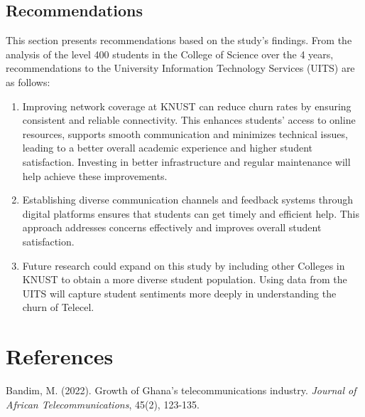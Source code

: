 \documentclass[doublespacing,12pt]{report}
\begin{document}
{ 



\section{Recommendations}
\normalsize{This section presents recommendations based on the study’s findings. From the analysis of the level 400 students in the College of Science over the 4 years, recommendations to the University Information Technology Services (UITS)  are as follows:}
\begin{enumerate}
        \item \normalsize{Improving network coverage at KNUST can reduce churn rates by ensuring consistent and reliable connectivity. This enhances students' access to online resources, supports smooth communication and minimizes technical issues, leading to a better overall academic experience and higher student satisfaction. Investing in better infrastructure and regular maintenance will help achieve these improvements}.

    \item  \normalsize{Establishing diverse communication channels and feedback systems through digital platforms ensures that students can get timely and efficient help. This 	approach addresses concerns effectively and improves overall student satisfaction.}
 
	\item \normalsize{Future research could expand on this study by including other Colleges in KNUST to obtain a more diverse student population. Using data from the UITS will capture student sentiments more deeply in understanding the churn of Telecel.}

\end{enumerate}









\chapter*{References}


\begin{enumerate}[label=\textbf{[\arabic*]}]


\item Bandim, M. (2022). Growth of Ghana's telecommunications industry. \textit{Journal of African Telecommunications}, 45(2), 123-135.


\end{enumerate}}
\end{document}
